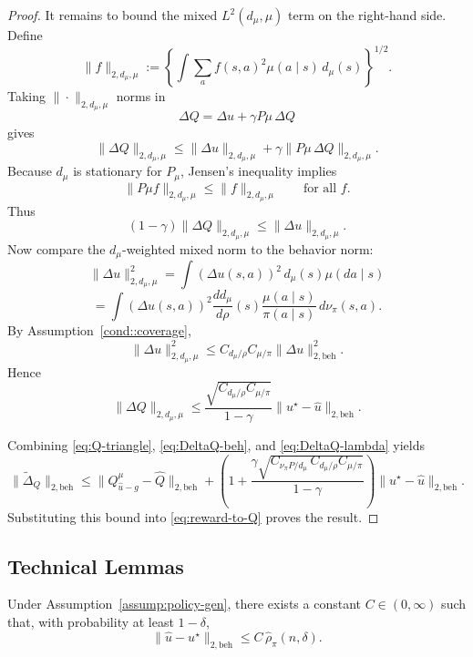 \begin{proof}
It remains to bound the mixed \(L^2(d_\mu,\mu)\) term on the right-hand side.
Define
\[
\|f\|_{2,d_\mu,\mu}
:=
\left\{
\int \sum_a f(s,a)^2\mu(a\mid s)\,d_\mu(s)
\right\}^{1/2}.
\]
Taking \(\|\cdot\|_{2,d_\mu,\mu}\) norms in
\[
\Delta Q=\Delta u+\gamma P\mu\,\Delta Q
\]
gives
\[
\|\Delta Q\|_{2,d_\mu,\mu}
\le
\|\Delta u\|_{2,d_\mu,\mu}
+
\gamma\|P\mu\,\Delta Q\|_{2,d_\mu,\mu}.
\]
Because \(d_\mu\) is stationary for \(P_\mu\), Jensen's inequality implies
\[
\|P\mu f\|_{2,d_\mu,\mu}
\le
\|f\|_{2,d_\mu,\mu}
\qquad
\text{for all }f.
\]
Thus
\[
(1-\gamma)\|\Delta Q\|_{2,d_\mu,\mu}
\le
\|\Delta u\|_{2,d_\mu,\mu}.
\]
Now compare the \(d_\mu\)-weighted mixed norm to the behavior norm:
\[
\|\Delta u\|_{2,d_\mu,\mu}^2
=
\int (\Delta u(s,a))^2\,d_\mu(s)\mu(da\mid s)
\]
\[
=
\int (\Delta u(s,a))^2
\frac{d d_\mu}{d\rho}(s)\frac{\mu(a\mid s)}{\pi(a\mid s)}
\,d\nu_\pi(s,a).
\]
By Assumption~\ref{cond::coverage},
\[
\|\Delta u\|_{2,d_\mu,\mu}^2
\le
C_{d_\mu/\rho}C_{\mu/\pi}\|\Delta u\|_{2,\mathrm{beh}}^2.
\]
Hence
\begin{equation}
\label{eq:DeltaQ-lambda}
\|\Delta Q\|_{2,d_\mu,\mu}
\le
\frac{\sqrt{C_{d_\mu/\rho}C_{\mu/\pi}}}{1-\gamma}\|u^\star-\hat u\|_{2,\mathrm{beh}}.
\end{equation}

Combining \eqref{eq:Q-triangle}, \eqref{eq:DeltaQ-beh}, and
\eqref{eq:DeltaQ-lambda} yields
\[
\|\widetilde\Delta_Q\|_{2,\mathrm{beh}}
\le
\|Q^\mu_{\hat u-g}-\hat Q\|_{2,\mathrm{beh}}
+
\left(
1+\frac{\gamma\sqrt{C_{\nu_\pi P/d_\mu}\,C_{d_\mu/\rho}C_{\mu/\pi}}}{1-\gamma}
\right)
\|u^\star-\hat u\|_{2,\mathrm{beh}}.
\]
Substituting this bound into \eqref{eq:reward-to-Q} proves the result.
\end{proof}

\subsection{Technical Lemmas}

\begin{lemma}
\label{lemma::KLell2}
Under Assumption~\ref{assump:policy-gen}, there exists a constant
\(C \in (0,\infty)\) such that, with probability at least \(1-\delta\),
\[
\|\hat u-u^\star\|_{2, \mathrm{beh}}
\le
C\,\hat\rho_{\pi}(n,\delta).
\]
\end{lemma}

